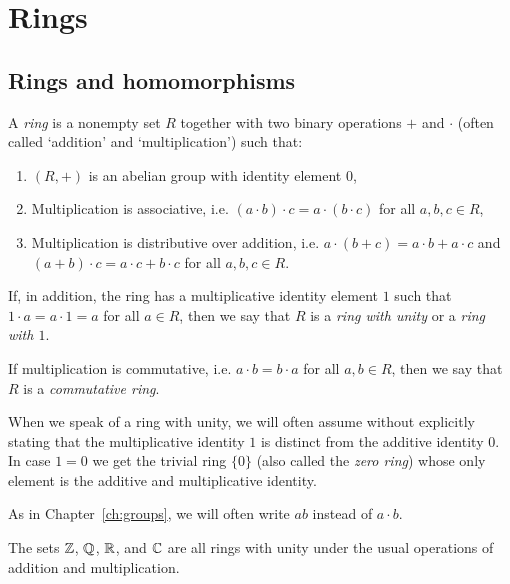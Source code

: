 \chapter{Rings}
\label{ch:rings}

\section{Rings and homomorphisms}

\begin{definition}
    A \emph{ring} is a nonempty set \(R\) together with two binary operations \(+\) and \(\cdot\) (often called `addition' and `multiplication') such that:
    \begin{enumerate}[label=(\alph*)]
        \item \((R, +)\) is an abelian group with identity element \(0\),
        \item Multiplication is associative, i.e. \((a \cdot b) \cdot c = a \cdot (b \cdot c)\) for all \(a, b, c \in R\),
        \item Multiplication is distributive over addition, i.e. \(a \cdot (b + c) = a \cdot b + a \cdot c\) and \((a + b) \cdot c = a \cdot c + b \cdot c\) for all \(a, b, c \in R\).
    \end{enumerate}

    If, in addition, the ring has a multiplicative identity element \(1\) such that \(1 \cdot a = a \cdot 1 = a\) for all \(a \in R\), then we say that \(R\) is a \emph{ring with unity} or a \emph{ring with \(1\)}.

    If multiplication is commutative, i.e. \(a \cdot b = b \cdot a\) for all \(a, b \in R\), then we say that \(R\) is a \emph{commutative ring}.
\end{definition}

\begin{remark}
    When we speak of a ring with unity, we will often assume without explicitly stating that the multiplicative identity \(1\) is distinct from the additive identity \(0\). In case \(1 = 0\) we get the trivial ring \(\{0\}\) (also called the \emph{zero ring}) whose only element is the additive and multiplicative identity.
\end{remark}

\begin{remark}
    As in Chapter~\ref{ch:groups}, we will often write \(ab\) instead of \(a \cdot b\).
\end{remark}

\begin{example}
    The sets \(\mathbb{Z}\), \(\mathbb{Q}\), \(\mathbb{R}\), and \(\mathbb{C}\) are all rings with unity under the usual operations of addition and multiplication.
\end{example}

